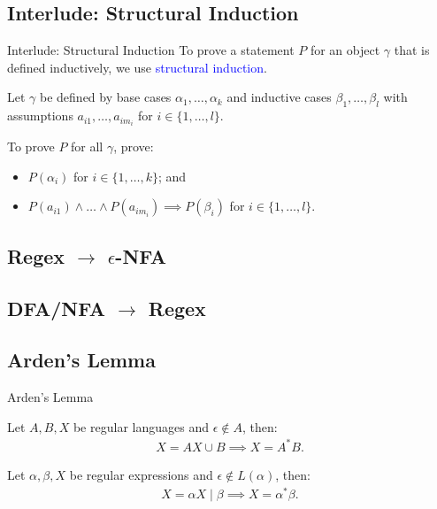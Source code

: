 \documentclass{beamer}
\def\padding{\vspace{0.5cm}}
\def\b{\textcolor{blue}}
\begin{document}
\subsection{Interlude: Structural Induction}

\begin{frame}{Interlude: Structural Induction}
    To prove a statement $P$ for an object $\gamma$ that is defined inductively, we use \b{structural induction}.\pause\padding

    Let $\gamma$ be defined by base cases $\alpha_1, \dots, \alpha_k$ and inductive cases $\beta_1, \dots, \beta_l$ with assumptions $a_{i1}, \dots, a_{im_i}$ for $i \in \{1, \dots, l\}$.\pause\padding

    To prove $P$ for all $\gamma$, prove:
    \begin{itemize}
        \item $P(\alpha_i)$ for $i \in \{1, \dots, k\}$\pause; and
        \item $P(a_{i1}) \land \dots \land P(a_{im_i}) \implies P(\beta_i)$ for $i \in \{1, \dots, l\}$.
    \end{itemize}
\end{frame}

\subsection{Regex $\to$ $\epsilon$-NFA}

\subsection{DFA/NFA $\to$ Regex}

\subsection{Arden's Lemma}

\begin{frame}{Arden's Lemma}
    \begin{theorem}
        Let $A, B, X$ be regular languages and $\epsilon \not\in A$, then:
        \begin{align*}
            X = AX \cup B \implies X = A^* B.
        \end{align*}
    \end{theorem}\pause
    \begin{theorem}
        Let $\alpha, \beta, X$ be regular expressions and $\epsilon \not\in L(\alpha)$, then:
        \begin{align*}
            X = \alpha X \mid \beta \implies X = \alpha^* \beta.
        \end{align*}
    \end{theorem}
\end{frame}
\end{document}
